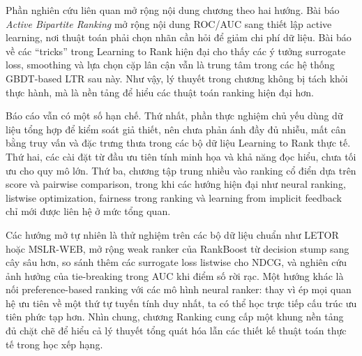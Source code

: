 \documentclass[12pt,a4paper]{article}
\begin{document}
Phần nghiên cứu liên quan mở rộng nội dung chương theo hai hướng. Bài báo \textit{Active Bipartite Ranking} mở rộng nội dung ROC/AUC sang thiết lập active learning, nơi thuật toán phải chọn nhãn cần hỏi để giảm chi phí dữ liệu. Bài báo về các ``tricks'' trong Learning to Rank hiện đại cho thấy các ý tưởng surrogate loss, smoothing và lựa chọn cặp lân cận vẫn là trung tâm trong các hệ thống GBDT-based LTR sau này. Như vậy, lý thuyết trong chương không bị tách khỏi thực hành, mà là nền tảng để hiểu các thuật toán ranking hiện đại hơn.

Báo cáo vẫn có một số hạn chế. Thứ nhất, phần thực nghiệm chủ yếu dùng dữ liệu tổng hợp để kiểm soát giả thiết, nên chưa phản ánh đầy đủ nhiễu, mất cân bằng truy vấn và đặc trưng thưa trong các bộ dữ liệu Learning to Rank thực tế. Thứ hai, các cài đặt từ đầu ưu tiên tính minh họa và khả năng đọc hiểu, chưa tối ưu cho quy mô lớn. Thứ ba, chương tập trung nhiều vào ranking cổ điển dựa trên score và pairwise comparison, trong khi các hướng hiện đại như neural ranking, listwise optimization, fairness trong ranking và learning from implicit feedback chỉ mới được liên hệ ở mức tổng quan.

Các hướng mở tự nhiên là thử nghiệm trên các bộ dữ liệu chuẩn như LETOR hoặc MSLR-WEB, mở rộng weak ranker của RankBoost từ decision stump sang cây sâu hơn, so sánh thêm các surrogate loss listwise cho NDCG, và nghiên cứu ảnh hưởng của tie-breaking trong AUC khi điểm số rời rạc. Một hướng khác là nối preference-based ranking với các mô hình neural ranker: thay vì ép mọi quan hệ ưu tiên về một thứ tự tuyến tính duy nhất, ta có thể học trực tiếp cấu trúc ưu tiên phức tạp hơn. Nhìn chung, chương Ranking cung cấp một khung nền tảng đủ chặt chẽ để hiểu cả lý thuyết tổng quát hóa lẫn các thiết kế thuật toán thực tế trong học xếp hạng.



\end{document}
